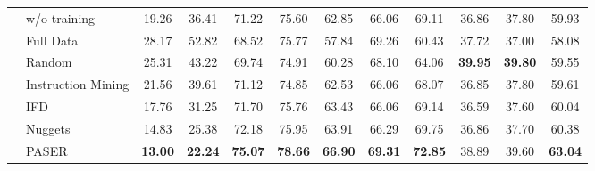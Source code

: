 \begin{table*}[t]
{\begin{tabular}{ll:cc:ccccccc:c}
& w/o training & 19.26 & 36.41 &71.22  &75.60 & 62.85  & 66.06 & 69.11 &36.86  & 37.80 & 59.93 \\
& Full Data & 28.17 & 52.82 & 68.52 & 75.77 & 57.84 & 69.26 & 60.43 & 37.72 & 37.00 & 58.08 \\
& Random  & 25.31 & 43.22 & 69.74 & 74.91 & 60.28 & 68.10 & 64.06 & \textbf{39.95} & \textbf{39.80} & 59.55  \\
 & Instruction Mining  & 21.56 & 39.61 & 71.12 & 74.85 & 62.53 & 66.06 & 68.07 & 36.85 & 37.80 & 59.61  \\
 & IFD & 17.76 & 31.25 & 71.70 & 75.76 & 63.43 & 66.06 & 69.14 & 36.59 & 37.60 & 60.04 \\
 & Nuggets & 14.83 & 25.38 & 72.18 & 75.95 & 63.91 & 66.29 & 69.75 & 36.86 & 37.70 & 60.38  \\
 & PASER & \textbf{13.00} & \textbf{22.24} & \textbf{75.07} & \textbf{78.66} & \textbf{66.90} & \textbf{69.31} & \textbf{72.85} & 38.89 & 39.60 & \textbf{63.04}  \\
\hline
\bottomrule
\end{tabular}}
\label{tab: kd}
\end{table*}
\vspace{-3mm}

